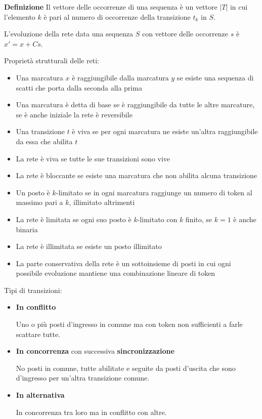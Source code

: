 \documentclass{article}
\newcommand{\df}[1]{\noindent\textbf{Definizione } #1.\newline}
\begin{document}
\df{Il vettore delle occorrenze di una sequenza è un vettore $|T|$ in cui l'elemento $k$ è pari al numero di occorrenze della transizione $t_k$ in $S$}

\noindent L'evoluzione della rete data una sequenza $S$ con vettore delle occorrenze $s$ è $x'=x+Cs$.

\newpage

\noindent Proprietà strutturali delle reti:
\begin{itemize}
    \item Una marcatura $x$ è raggiungibile dalla marcatura $y$ se esiste una sequenza di scatti che porta dalla seconda alla prima
    \item Una marcatura è detta di base se è raggiungibile da tutte le altre marcature, se è anche iniziale la rete è reversibile
    \item Una transizione $t$ è viva se per ogni marcatura ne esiste un'altra raggiungibile da essa che abilita $t$
    \item La rete è viva se tutte le sue transizioni sono vive
    \item La rete è bloccante se esiste una marcatura che non abilita alcuna transizione
    \item Un posto è $k$-limitato se in ogni marcatura raggiunge un numero di token al massimo pari a $k$, illimitato altrimenti
    \item La rete è limitata se ogni suo posto è $k$-limitato con $k$ finito, se $k=1$ è anche binaria
    \item La rete è illimitata se esiste un posto illimitato
    \item La parte conservativa della rete è un sottoinsieme di posti in cui ogni possibile evoluzione mantiene una combinazione lineare di token\newline
\end{itemize}

\noindent Tipi di transizioni:
\begin{itemize}
    \item \textbf{In conflitto}

        Uno o più posti d'ingresso in comune ma con token non sufficienti a farle scattare tutte.

    \item \textbf{In concorrenza} con successiva \textbf{sincronizzazione}

        No posti in comune, tutte abilitate e seguite da posti d'uscita che sono d'ingresso per un'altra transizione comune.

    \item \textbf{In alternativa}

        In concorrenza tra loro ma in conflitto con altre.
    
\end{itemize}
\end{document}
